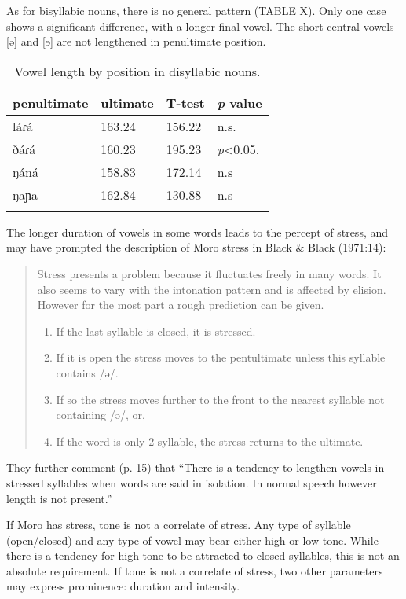 As for bisyllabic nouns, there is no general pattern (TABLE X). Only one case shows a significant difference, with a longer final vowel. The short central vowels [ə] and [ɘ] are not lengthened in penultimate position. 

\begin{table}
  \begin{tabular}[t]{llll}
    \lsptoprule
	penultimate	&	ultimate	&	T-test & 
\textit{p} value	\\
\midrule 
láɾá	&	163.24	&	156.22	&	n.s.	\\
ðáɾá	&	160.23	&	195.23	&	\textit{p}<0.05.	\\
ŋáná	&	158.83	&	172.14	&	n.s	\\
ŋaɲa	&	162.84	&	130.88	&	n.s	\\
\lspbottomrule
  \end{tabular}
  \caption{Vowel length by position in disyllabic nouns.}
  \label{tab:ch2:Y}
\end{table}

The longer duration of vowels in some words leads to the percept of stress, and may have prompted the description of Moro stress in Black \& Black (1971:14):
\begin{quotation}
Stress presents a problem because it fluctuates freely in many words. It also seems to vary with the intonation pattern and is affected by elision. However for the most part a rough prediction can be given.
\begin{enumerate}
	\item If the last syllable is closed, it is stressed.

	\item If it is open the stress moves to the pentultimate unless this syllable contains /ə/. 
	\item If so the stress moves further to the front to the nearest syllable not containing /ə/, or,
	\item If the word is only 2 syllable, the stress returns to the ultimate.	
\end{enumerate}
\end{quotation}

They further comment (p. 15) that “There is a tendency to lengthen vowels in stressed syllables when words are said in isolation. In normal speech however length is not present.”

If Moro has stress, tone is not a correlate of stress. Any type of syllable (open/closed) and any type of vowel may bear either high or low tone. While there is a tendency for high tone to be attracted to closed syllables, this is not an absolute requirement. If tone is not a correlate of stress, two other parameters may express prominence: duration and intensity. 

